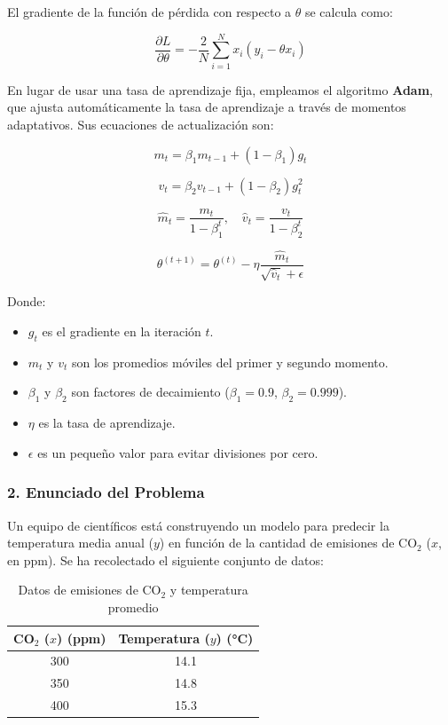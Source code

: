 \documentclass{article}
\begin{document}
El gradiente de la función de pérdida con respecto a \( \theta \) se calcula como:

\[
\frac{\partial L}{\partial \theta} = -\frac{2}{N} \sum_{i=1}^{N} x_i (y_i - \theta x_i)
\]

En lugar de usar una tasa de aprendizaje fija, empleamos el algoritmo \textbf{Adam}, que ajusta automáticamente la tasa de aprendizaje a través de momentos adaptativos. Sus ecuaciones de actualización son:

\[
m_t = \beta_1 m_{t-1} + (1 - \beta_1) g_t
\]

\[
v_t = \beta_2 v_{t-1} + (1 - \beta_2) g_t^2
\]

\[
\hat{m}_t = \frac{m_t}{1 - \beta_1^t}, \quad \hat{v}_t = \frac{v_t}{1 - \beta_2^t}
\]

\[
\theta^{(t+1)} = \theta^{(t)} - \eta \frac{\hat{m}_t}{\sqrt{\hat{v}_t} + \epsilon}
\]

Donde:
\begin{itemize}
	\item \( g_t \) es el gradiente en la iteración \( t \).
	\item \( m_t \) y \( v_t \) son los promedios móviles del primer y segundo momento.
	\item \( \beta_1 \) y \( \beta_2 \) son factores de decaimiento (\( \beta_1 = 0.9 \), \( \beta_2 = 0.999 \)).
	\item \( \eta \) es la tasa de aprendizaje.
	\item \( \epsilon \) es un pequeño valor para evitar divisiones por cero.
\end{itemize}

\subsubsection*{2. Enunciado del Problema}

Un equipo de científicos está construyendo un modelo para predecir la temperatura media anual (\( y \)) en función de la cantidad de emisiones de CO$_{2}$ (\( x \), en ppm). Se ha recolectado el siguiente conjunto de datos:

\begin{table}[h]
	\centering
	\begin{tabular}{|c|c|}
		\hline
		CO$_{2}$ (\( x \)) (ppm) & Temperatura (\( y \)) (°C) \\
		\hline
		300 & 14.1 \\
		350 & 14.8 \\
		400 & 15.3 \\
		\hline
	\end{tabular}
	\caption{Datos de emisiones de CO$_{2}$ y temperatura promedio}
\end{table}
\end{document}
